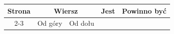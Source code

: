 \documentclass[a4paper,11pt]{article}
\numberwithin{equation}{section}
\begin{document}
\newpage



\begin{center}

  \begin{tabular}{|c|c|c|c|c|}
    \hline
    Strona & \multicolumn{2}{c|}{Wiersz} & Jest
                              & Powinno być \\ \cline{2-3}
    & Od góry & Od dołu & & \\
    \hline
    \hline
  \end{tabular}

\end{center}

\VerSpaceSix













\printbibliography





\end{document}

